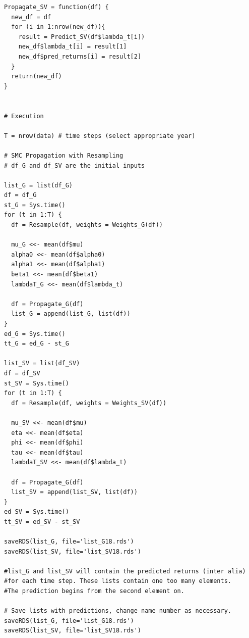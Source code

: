 \documentclass[12pt,letterpaper,reqno,fleqn]{article}
\begin{document}
\begin{verbatim}
Propagate_SV = function(df) {
  new_df = df
  for (i in 1:nrow(new_df)){
    result = Predict_SV(df$lambda_t[i])
    new_df$lambda_t[i] = result[1]
    new_df$pred_returns[i] = result[2]
  }
  return(new_df)
}


# Execution

T = nrow(data) # time steps (select appropriate year)

# SMC Propagation with Resampling
# df_G and df_SV are the initial inputs

list_G = list(df_G)
df = df_G
st_G = Sys.time()
for (t in 1:T) {
  df = Resample(df, weights = Weights_G(df))
  
  mu_G <<- mean(df$mu)
  alpha0 <<- mean(df$alpha0)
  alpha1 <<- mean(df$alpha1)
  beta1 <<- mean(df$beta1)
  lambdaT_G <<- mean(df$lambda_t)

  df = Propagate_G(df)
  list_G = append(list_G, list(df))
}
ed_G = Sys.time()
tt_G = ed_G - st_G

list_SV = list(df_SV)
df = df_SV
st_SV = Sys.time()
for (t in 1:T) {
  df = Resample(df, weights = Weights_SV(df))
  
  mu_SV <<- mean(df$mu)
  eta <<- mean(df$eta)
  phi <<- mean(df$phi)
  tau <<- mean(df$tau)
  lambdaT_SV <<- mean(df$lambda_t)

  df = Propagate_G(df)
  list_SV = append(list_SV, list(df))
}
ed_SV = Sys.time()
tt_SV = ed_SV - st_SV

saveRDS(list_G, file='list_G18.rds') 
saveRDS(list_SV, file='list_SV18.rds')

#list_G and list_SV will contain the predicted returns (inter alia)
#for each time step. These lists contain one too many elements. 
#The prediction begins from the second element on.

# Save lists with predictions, change name number as necessary.
saveRDS(list_G, file='list_G18.rds') 
saveRDS(list_SV, file='list_SV18.rds')

\end{verbatim}
\end{document}
